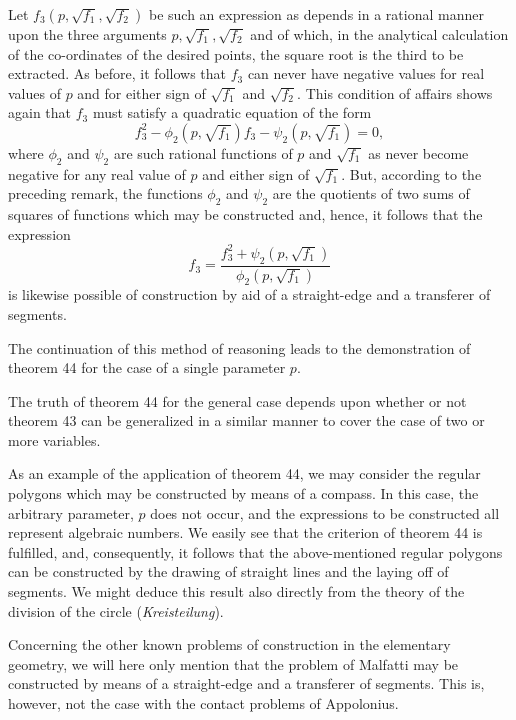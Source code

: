 \documentclass[11pt,oneside]{book}
\begin{document}
Let $f_3(p, \sqrt{f_1}, \sqrt{f_2})$ be such an expression as depends
in a rational manner upon the three arguments
$p, \sqrt{f_1}, \sqrt{f_2}$ and of which, in the analytical calculation
of the co-ordinates of the desired points, the square
root is the third to be extracted. As before, it follows
that $f_3$ can never have negative values for real
values of $p$ and for either sign of $\sqrt{f_1}$ and $\sqrt{f_2}$. This
condition of affairs shows again that $f_3$ must satisfy a
quadratic equation of the form
\[
 f_3^2 - \phi_2(p, \sqrt{f_1}) f_3 - \psi_2(p, \sqrt{f_1}) = 0,
\]
where $\phi_2$ and $\psi_2$ are such rational functions of $p$ and
$\sqrt{f_1}$ as never become negative for any real value of $p$
and either sign of $\sqrt{f_1}$. But, according to the preceding
remark, the functions $\phi_2$ and $\psi_2$ are the quotients
of two sums of squares of functions which may be constructed
and, hence, it follows that the expression
\[
f_3 = \frac{f_3^2 + \psi_2(p, \sqrt{f_1})}{\phi_2(p, \sqrt{f_1})}
\]
is likewise possible of construction by aid of a straight-edge
and a transferer of segments.

The continuation of this method of reasoning leads
to the demonstration of theorem 44 for the case of a
single parameter $p$.

The truth of theorem 44 for the general case depends
upon whether or not theorem 43 can be generalized
in a similar manner to cover the case of two
or more variables.

As an example of the application of theorem 44,
we may consider the regular polygons which may be
constructed by means of a compass. In this case, the
arbitrary parameter, $p$ does not occur, and the expressions
to be constructed all represent algebraic numbers.
We easily see that the criterion of theorem 44
is fulfilled, and, consequently, it follows that the above-mentioned
regular polygons can be constructed by the
drawing of straight lines and the laying off of segments.
We might deduce this result also directly from the
theory of the division of the circle (\textit{Kreisteilung}).

Concerning the other known problems of construction
in the elementary geometry, we will here only
mention that the problem of Malfatti may be constructed
by means of a straight-edge and a transferer
of segments. This is, however, not the case with the
contact problems of Appolonius.

\newpage
{}\label{pc}
\end{document}
